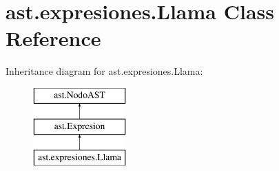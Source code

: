 \hypertarget{classast_1_1expresiones_1_1_llama}{}\section{ast.\+expresiones.\+Llama Class Reference}
\label{classast_1_1expresiones_1_1_llama}
Inheritance diagram for ast.\+expresiones.\+Llama\+:\begin{figure}[H]
\begin{center}
\leavevmode
\includegraphics[height=3.000000cm]{classast_1_1expresiones_1_1_llama}
\end{center}
\end{figure}
